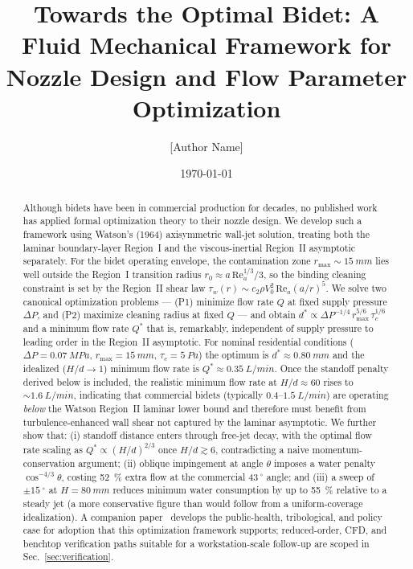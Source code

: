 \documentclass[10pt,letterpaper]{article}
\newcommand{\Rey}{\mathrm{Re}}
\begin{document}
\title{Towards the Optimal Bidet: A Fluid Mechanical Framework
  for Nozzle Design and Flow Parameter Optimization}

\author{[Author Name]}

\date{\today}

\begin{abstract}
Although bidets have been in commercial production for decades, no published
work has applied formal optimization theory to their nozzle design. We
develop such a framework using Watson's (1964) axisymmetric wall-jet solution,
treating both the laminar boundary-layer Region~I and the viscous-inertial
Region~II asymptotic separately. For the bidet operating envelope, the
contamination zone $r_\mathrm{max} \sim 15~mm$ lies well outside
the Region~I transition radius $r_0 \approx a\,\Rey_a^{1/3}/3$, so the
binding cleaning constraint is set by the Region~II shear law
$\tau_w(r) \sim c_2 \rho V_0^2\,\Rey_a (a/r)^5$. We solve two canonical
optimization problems --- (P1) minimize flow rate $Q$ at fixed supply
pressure $\Delta P$, and (P2) maximize cleaning radius at fixed $Q$ ---
and obtain $d^* \propto \Delta P^{-1/4}\,r_\mathrm{max}^{5/6}\,\tau_c^{1/6}$
and a minimum flow rate $Q^*$ that is, remarkably, independent of supply
pressure to leading order in the Region~II asymptotic. For nominal
residential conditions ($\Delta P = 0.07~MPa$, $r_\mathrm{max} = 15~mm$,
$\tau_c = 5~Pa$) the optimum is
$d^* \approx 0.80~mm$ and the idealized
($H/d \to 1$) minimum flow rate is $Q^* \approx 0.35~L/min$. Once
the standoff penalty derived below is included, the realistic minimum
flow rate at $H/d \approx 60$ rises to $\sim 1.6~L/min$, indicating
that commercial bidets (typically $0.4$--$1.5~L/min$) are operating
\emph{below} the Watson Region~II laminar lower bound and therefore must
benefit from turbulence-enhanced wall shear not captured by the laminar
asymptotic. We further show that: (i) standoff
distance enters through free-jet decay, with the optimal flow rate
scaling as $Q^* \propto (H/d)^{2/3}$ once $H/d \gtrsim 6$, contradicting
a naive momentum-conservation argument; (ii) oblique impingement at
angle $\theta$ imposes a water penalty $\cos^{-4/3}\theta$, costing
52~\% extra flow at the commercial $43~^\circ $ angle;
and (iii) a sweep of $\pm15~^\circ $ at $H = 80~mm$
reduces minimum water consumption by up to 55~\% relative
to a steady jet (a more conservative figure than would follow from a
uniform-coverage idealization). A companion paper~\citep{BurtonCasePaper}
develops the public-health, tribological, and policy case for adoption
that this optimization framework supports; reduced-order, CFD, and
benchtop verification paths suitable for a workstation-scale
follow-up are scoped in Sec.~\ref{sec:verification}.
\end{abstract}
\end{document}
